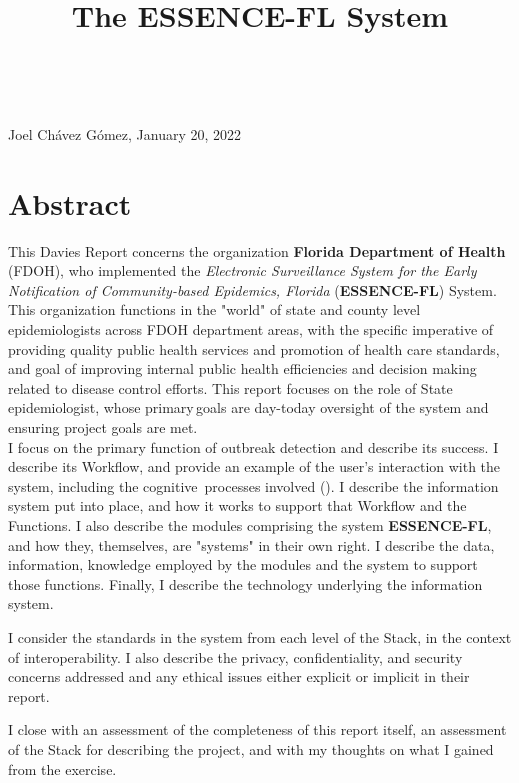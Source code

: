 \documentclass{article}
\title{The ESSENCE-FL System}
\begin{document}
\begin{Huge}
\\
\end{Huge}
Joel Chávez Gómez, January 20, 2022
\section{Abstract}

This Davies Report concerns the organization \textbf{Florida Department of Health} (FDOH), who implemented the \textit{Electronic Surveillance System for the Early Notification of Community-based Epidemics, Florida} (\textbf{ESSENCE-FL}) System. This organization functions in the "world" of state and county level epidemiologists across FDOH department areas, with the specific imperative of providing quality public health services and promotion of health care standards, and goal of improving internal public health efficiencies and decision making related to disease control efforts. This report focuses on the role of State epidemiologist, whose primary goals are day-today oversight of the system and ensuring project goals are met.\\

I focus on the primary function of outbreak detection and describe its success. I describe its Workflow, and provide an example of the user's interaction with the system, including the cognitive  processes involved (). I describe the information system put into place, and how it works to support that Workflow and the Functions. I also describe the modules comprising the system \textbf{ESSENCE-FL}, and how they, themselves, are "systems" in their own right. I describe the data, information, knowledge employed by the modules and the system to support those functions. Finally, I describe the technology underlying the information system.

I consider the standards in the system from each level of the Stack, in the context of interoperability. I also describe the privacy, confidentiality, and security concerns addressed and any ethical issues either explicit or implicit in their report.

I close with an assessment of the completeness of this report itself, an assessment of the Stack for describing the project, and with my thoughts on what I gained from the exercise. 
\end{document}
